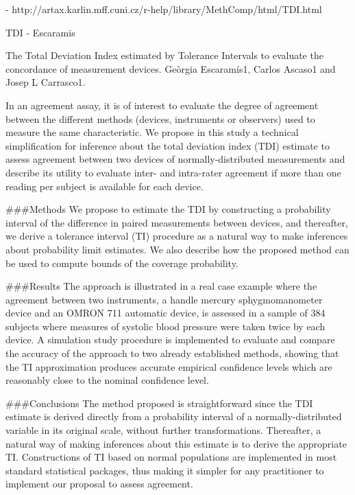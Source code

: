 \documentclass[MAIN.tex]{subfiles}
\begin{document}
- http://artax.karlin.mff.cuni.cz/r-help/library/MethComp/html/TDI.html

\newpage
TDI - Escaramis

The Total Deviation Index estimated by Tolerance Intervals to evaluate the concordance of measurement devices.  
Geòrgia Escaramís1, Carlos Ascaso1 and Josep L Carrasco1.  

In an agreement assay, it is of interest to evaluate the degree of agreement between the different methods (devices, instruments or observers) used to measure the same characteristic. We propose in this study a technical simplification for inference about the total deviation index (TDI) estimate to assess agreement between two devices of normally-distributed measurements and describe its utility to evaluate inter- and intra-rater agreement if more than one reading per subject is available for each device.

###Methods
We propose to estimate the TDI by constructing a probability interval of the difference in paired measurements between devices, and thereafter, we derive a tolerance interval (TI) procedure as a natural way to make inferences about probability limit estimates. We also describe how the proposed method can be used to compute bounds of the coverage probability.

###Results
The approach is illustrated in a real case example where the agreement between two instruments, a handle mercury sphygmomanometer device and an OMRON 711 automatic device, is assessed in a sample of 384 subjects where measures of systolic blood pressure were taken twice by each device. A simulation study procedure is implemented to evaluate and compare the accuracy of the approach to two already established methods, showing that the TI approximation produces accurate empirical confidence levels which are reasonably close to the nominal confidence level.

###Conclusions
The method proposed is straightforward since the TDI estimate is derived directly from a probability interval of a normally-distributed variable in its original scale, without further transformations. Thereafter, a natural way of making inferences about this estimate is to derive the appropriate TI. Constructions of TI based on normal populations are implemented in most standard statistical packages, thus making it simpler for any practitioner to implement our proposal to assess agreement.
\newpage
	
\end{document}

